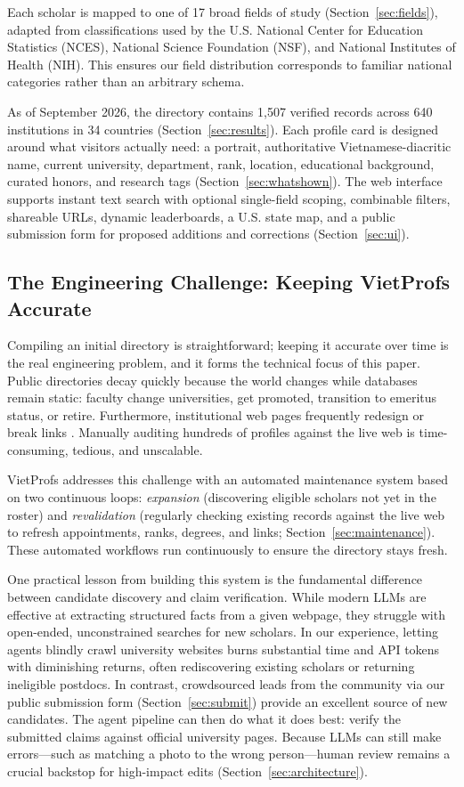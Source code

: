 \documentclass[11pt]{article}
\begin{document}
Each scholar is mapped to one of 17 broad fields of study (Section~\ref{sec:fields}), adapted from classifications used by the U.S. National Center for Education Statistics (NCES), National Science Foundation (NSF), and National Institutes of Health (NIH).
This ensures our field distribution corresponds to familiar national categories rather than an arbitrary schema.

As of September 2026, the directory contains 1,507 verified records across 640 institutions in 34 countries (Section~\ref{sec:results}).
Each profile card is designed around what visitors actually need: a portrait, authoritative Vietnamese-diacritic name, current university, department, rank, location, educational background, curated honors, and research tags (Section~\ref{sec:whatshown}).
The web interface supports instant text search with optional single-field scoping, combinable filters, shareable URLs, dynamic leaderboards, a U.S. state map, and a public submission form for proposed additions and corrections (Section~\ref{sec:ui}).

\subsection{The Engineering Challenge: Keeping VietProfs Accurate}
\label{sec:intro-how}
Compiling an initial directory is straightforward; keeping it accurate over time is the real engineering problem, and it forms the technical focus of this paper.
Public directories decay quickly because the world changes while databases remain static: faculty change universities, get promoted, transition to emeritus status, or retire.
Furthermore, institutional web pages frequently redesign or break links \cite{bar-yossef2004sic}.
Manually auditing hundreds of profiles against the live web is time-consuming, tedious, and unscalable.

VietProfs addresses this challenge with an automated maintenance system based on two continuous loops: \emph{expansion} (discovering eligible scholars not yet in the roster) and \emph{revalidation} (regularly checking existing records against the live web to refresh appointments, ranks, degrees, and links; Section~\ref{sec:maintenance}).
These automated workflows run continuously to ensure the directory stays fresh.

One practical lesson from building this system is the fundamental difference between candidate discovery and claim verification.
While modern LLMs are effective at extracting structured facts from a given webpage, they struggle with open-ended, unconstrained searches for new scholars.
In our experience, letting agents blindly crawl university websites burns substantial time and API tokens with diminishing returns, often rediscovering existing scholars or returning ineligible postdocs.
In contrast, crowdsourced leads from the community via our public submission form (Section~\ref{sec:submit}) provide an excellent source of new candidates.
The agent pipeline can then do what it does best: verify the submitted claims against official university pages.
Because LLMs can still make errors---such as matching a photo to the wrong person---human review remains a crucial backstop for high-impact edits (Section~\ref{sec:architecture}).
\end{document}
